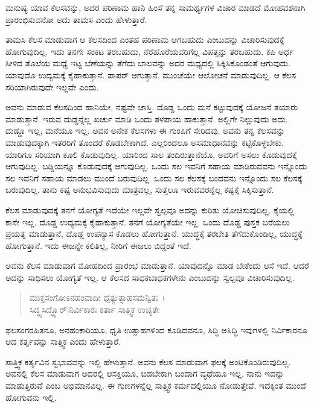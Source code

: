 {\small ಮನುಷ್ಯ ಯಾವ ಕೆಲಸವನ್ನು, ಅದರ ಪರಿಣಾಮ ಹಾನಿ ಹಿಂಸೆ ತನ್ನ ಸಾಮರ್ಥ್ಯಗಳ ವಿಚಾರ ಮಾಡದೆ ಮೋಹವಶನಾಗಿ ಪ್ರಾರಂಭಿಸುವನೋ ಅದು ತಾಮಸ ಎಂದು ಹೇಳುತ್ತಾರೆ.}

ತಾಮಸಿ ಕೆಲಸ ಮಾಡುವಾಗ ಆ ಕೆಲಸದಿಂದ ಎಂತಹ ಪರಿಣಾಮ ಆಗಬಹುದು ಎಂಬುದನ್ನು ವಿಚಾರಿಸುವುದಕ್ಕೆ ಹೋಗುವುದಿಲ್ಲ. ಇದು ತನಗೇ ಸಂಕಟ ತರಬಹುದು, ನೆರೆಹೊರೆಯವರಿಗೆಲ್ಲ ವಿಪತ್ತನ್ನು ತರಬಹುದು. ಕಪಿ ಅರ್ಧ ಸೀಳಿದ ತೊಲೆಯ ಮಧ್ಯೆ ಇಟ್ಟ ಬೆಣೆಯನ್ನು ತೆಗೆದು ಬಾಲವನ್ನು ಅದರ ಮಧ್ಯದಲ್ಲಿ ಸಿಕ್ಕಿಸಿಕೊಂಡಂತೆ ಆಗುವುದು. ಯಾವುದೊ ಉದ್ಯಮಕ್ಕೆ ಕೈಹಾಕುತ್ತಾನೆ. ಪಾಪರ್ ಆಗುತ್ತಾನೆ. ಮುಂಚೆಯೇ ಆಲೋಚನೆ ಮಾಡುವುದಿಲ್ಲ. ಆ ಕೆಲಸ ಸರಿಯಾಗಿರುವುದೇ ಇಲ್ಲವೇ ಎಂದು.

ಅವನು ಮಾಡುವ ಕೆಲಸದಿಂದ ಹಾನಿಯೇ, ನಷ್ಟವೇ ಜಾಸ್ತಿ. ದೊಡ್ಡ ಒಂದು ಮನೆ ಕಟ್ಟುವುದಕ್ಕೆ ಯೋಜನೆ ತಯಾರು ಮಾಡುತ್ತಾನೆ. ಇರುವ ದುಡ್ಡನ್ನೆಲ್ಲ ಖರ್ಚು ಮಾಡಿ ಒಂದು ತಳಪಾಯ ಹಾಕುತ್ತಾನೆ. ಅಲ್ಲಿಗೇ ನಿಲ್ಲುವುದು ಅದು. ದುಡ್ಡೂ ಇಲ್ಲ, ಮನೆಯೂ ಇಲ್ಲ. ಅವನ ಅನೇಕ ಕೆಲಸಗಳು ಈ ಗುಂಪಿಗೆ ಸೇರಿದವು. ಅವನು ತನ್ನ ಕೆಲಸವನ್ನು ಮಾಡುವುದಕ್ಕಾಗಿ ಇತರರಿಗೆ ತೊಂದರೆ ಕೊಡಬೇಕಾಗಿದೆ. ಎಲ್ಲರಿಂದಲೂ ಅಸಮಾಧಾನವನ್ನು ಕಟ್ಟಿಕೊಳ್ಳಬೇಕು. ಯಾರಿಗೂ ಸರಿಯಾಗಿ ಕೂಲಿ ಕೊಡುವುದಿಲ್ಲ. ಯಾರಿಂದ ಸಾಲ ತಂದಿರುತ್ತಾನೆಯೊ, ಅವರಿಗೆ ಅಸಲು ಕೊಡುವುದಕ್ಕೆ ಆಗುವುದಿಲ್ಲ. ಬಡ್ಡಿಯನ್ನೂ ಕೊಡುವುದಕ್ಕೆ ಆಗುವುದಿಲ್ಲ. ಒಂದು ಸಲ ಇವನಿಗೆ ಸಹಾಯ ಮಾಡಿರುವವನು ಇನ್ನೊಂದು ಸಲ ಇವನಿಗೆ ಸಹಾಯ ಮಾಡಲು ಮುಂದೆ ಬರುವುದಿಲ್ಲ. ಒಂದು ಸಲ ಕೆಲಸಕ್ಕೆ ಬಂದವನು ಇನ್ನೊಂದು ಸಲ ಕೆಲಸಕ್ಕೆ ಬರುವುದಿಲ್ಲ. ತಾನು ಕಷ್ಟ ಅನುಭವಿಸುವುದು ಮಾತ್ರವಲ್ಲ, ಸುತ್ತಲೂ ಇರುವವರನ್ನೆಲ್ಲ ಕಷ್ಟಕ್ಕೆ ಸಿಕ್ಕಿಸುತ್ತಾನೆ.

ಕೆಲಸ ಮಾಡುವುದಕ್ಕೆ ತನಗೆ ಯೋಗ್ಯತೆ ಇದೆಯೇ ಇಲ್ಲವೇ ಸ್ವಲ್ಪವೂ ಅದನ್ನು ಕುರಿತು ಯೋಚಿಸುವುದಿಲ್ಲ. ಕೈಯಲ್ಲಿ ಕಾಸೇ ಇಲ್ಲ. ದೊಡ್ಡ ಉದ್ಯಮಕ್ಕೆ ಕೈಹಾಕುತ್ತಾನೆ. ತನಗೆ ಯೋಗ್ಯತೆಯೇ ಇಲ್ಲ. ಒಂದು ದೊಡ್ಡ ಪುಸ್ತಕ ಬರೆಯಲು ಪ್ರಯತ್ನ ಮಾಡುತ್ತಾನೆ, ದೊಡ್ಡ ಉಪನ್ಯಾಸ ಕೊಡಲು ಹೋಗುತ್ತಾನೆ. ಯುದ್ಧಕ್ಕೆ ತರಬೇತಿ ತೆಗೆದುಕೊಂಡಿಲ್ಲ, ಯುದ್ಧಕ್ಕೆ ಹೋಗುತ್ತಾನೆ. ಇದು ಈಜನ್ನೇ ಕಲಿತಿಲ್ಲ, ನೀರಿಗೆ ಈಜಲು ಬಿದ್ದಂತೆ ಇದೆ.

ಅವನು ಕೆಲಸ ಮಾಡುವಾಗ ಮೋಹದಿಂದ ಪ್ರಾರಂಭ ಮಾಡುತ್ತಾನೆ. ಯಾವುದನ್ನೊ ಮಾಡ ಬೇಕೆಂದು ಆಸೆ ಇದೆ. ಆದರೆ ಅದನ್ನು ಸಾಧಿಸಲು ಯೋಗ್ಯತೆ ಇಲ್ಲ. ಆ ಕೆಲಸದ ಸಾಧಕಬಾಧಕಗಳೇನು ಎಂಬುದನ್ನು ಸ್ವಲ್ಪವೂ ವಿಚಾರಿಸುವುದಿಲ್ಲ.

\begin{verse}
ಮುಕ್ತಸಂಗೋಽನಹಂವಾದೀ ಧೃತ್ಯುತ್ಸಾಹಸಮನ್ವಿತಃ~।\\ಸಿದ್ಧ್ಯಸಿದ್ಧ್ಯೊರ್|ನಿರ್ವಿಕಾರಃ ಕರ್ತಾ ಸಾತ್ತ್ವಿಕ ಉಚ್ಯತೇ 
\end{verse}

{\small ಫಲಸಂಗರಹಿತನೂ, ಅನಹಂಕಾರಿಯೂ, ಧೃತಿ ಉತ್ಸಾಹಗಳಿಂದ ಕೂಡಿದವನೂ, ಸಿದ್ಧಿ ಅಸಿದ್ಧಿ ಇವುಗಳಲ್ಲಿ ನಿರ್ವಿಕಾರನೂ ಆದ ಕರ್ತೃವನ್ನು ಸಾತ್ತ್ವಿಕ ಎಂದು ಹೇಳುತ್ತಾರೆ.}

ಸಾತ್ತ್ವಿಕ ಕರ್ತೃವಿನ ಸ್ವಭಾವವನ್ನು ಇಲ್ಲಿ ಹೇಳುತ್ತಾನೆ. ಅವನು ಕೆಲಸ ಮಾಡುವಾಗ ಫಲಕ್ಕೆ ಅಂಟಿಕೊಂಡಿರುವುದಿಲ್ಲ. ಅವನಲ್ಲಿ ಕೆಲಸ ಮಾಡುವಾಗ ಅದರಲ್ಲಿ ಆಸಕ್ತಿಯೂ, ಬಿಡಬೇಕಾಗಿ ಬಂದಾಗ ವ್ಯಥೆಯೂ ಇಲ್ಲ. ನಾನು ಇದನ್ನು ಮಾಡುತ್ತಿರುವೆ ಎಂಬ ಅಭಿಮಾನವಿಲ್ಲ. ಈ ಗುಣಗಳನ್ನೆಲ್ಲ ಸಾತ್ತ್ವಿಕ ಕರ್ಮದಲ್ಲಿಯೂ ನೋಡುತ್ತೇವೆ. ಇದಕ್ಕಿಂತ ಮುಂದೆ ಹೋಗುವನು ಇಲ್ಲಿ.

